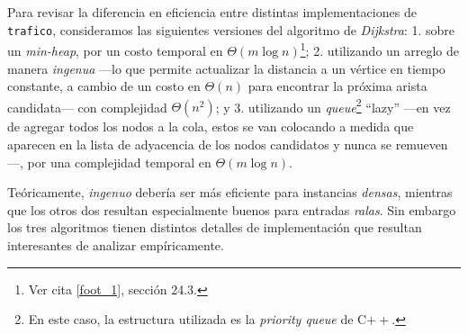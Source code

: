 Para revisar la diferencia en eficiencia entre distintas implementaciones de \texttt{trafico}, consideramos las siguientes versiones del algoritmo de \textit{Dijkstra}: 1. sobre un \textit{min-heap}, por un costo temporal en $\Theta(m\log n)$\footnote{Ver cita \ref{foot_1}, sección 24.3.}; 2. utilizando un arreglo de manera \textit{ingenua} ---lo que permite actualizar la distancia a un vértice en tiempo constante, a cambio de un costo en $\Theta(n)$ para encontrar la próxima arista candidata--- con complejidad $\Theta(n^2)$; y 3. utilizando un \textit{queue}\footnote{En este caso, la estructura utilizada es la \textit{priority queue} de C$++$.} ``lazy'' ---en vez de agregar todos los nodos a la cola, estos se van colocando a medida que aparecen en la lista de adyacencia de los nodos candidatos y nunca se remueven---, por una complejidad temporal en $\Theta(m\log n)$.

Teóricamente, \textit{ingenuo} debería ser más eficiente para instancias \textit{densas}, mientras que los otros dos resultan especialmente buenos para entradas \textit{ralas}. Sin embargo los tres algoritmos tienen distintos detalles de implementación que resultan interesantes de analizar empíricamente.%

